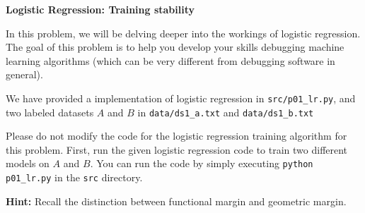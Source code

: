 \clearpage
\item {} {\bf Logistic Regression: Training stability}

In this problem, we will be delving deeper into the workings of logistic
regression. The goal of this problem is to help you develop your skills
debugging machine learning algorithms (which can be very different from
debugging software in general).

We have provided a implementation of logistic regression in
\texttt{src/p01\_lr.py}, and two labeled datasets $A$ and $B$ in
\texttt{data/ds1\_a.txt} and \texttt{data/ds1\_b.txt}

Please do not modify the code for the logistic regression training algorithm
for this problem. First, run the given logistic regression code to train two
different models on $A$ and $B$. You can run the code by simply executing 
\texttt{python p01\_lr.py} in the \texttt{src} directory.

\begin{enumerate}

  

  

  
  
  

\end{enumerate}

\textbf{Hint:} Recall the distinction between functional margin and geometric
margin.
